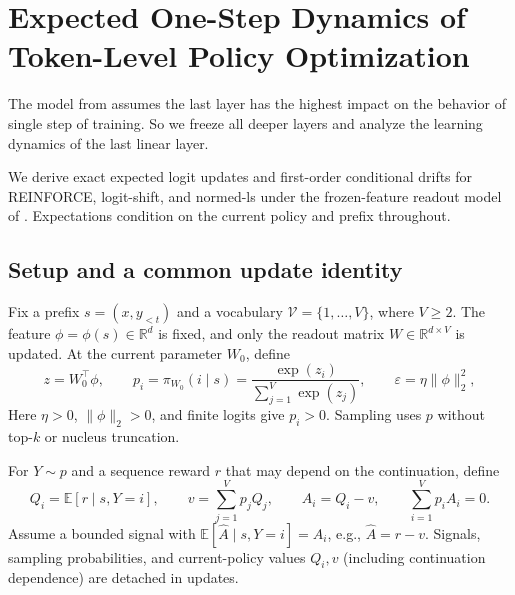 \section{Expected One-Step Dynamics of Token-Level Policy Optimization}
\label{app:token-learning-dynamics}

\begin{insight}
  The model from \citet{ren_learning_2025} assumes the last layer has the highest impact on the behavior of single step of training. So we freeze all deeper layers and analyze the learning dynamics of the last linear layer.
\end{insight}

We derive exact expected logit updates and first-order conditional drifts
for REINFORCE, logit-shift, and normed-ls under the frozen-feature readout
model of \citet[Appendix~E]{ren_learning_2025}. Expectations condition
on the current policy and prefix throughout.

\subsection{Setup and a common update identity}
\label{app:dynamics-setup}

Fix a prefix $s=(x,y_{<t})$ and a vocabulary $\mathcal V=\{1,\ldots,V\}$,
where $V\ge 2$. The feature $\phi=\phi(s)\in\mathbb R^d$ is fixed, and
only the readout matrix $W\in\mathbb R^{d\times V}$ is updated. At the
current parameter $W_0$, define
\begin{equation}
 z=W_0^\top\phi,\qquad
 p_i=\pi_{W_0}(i\mid s)=\frac{\exp(z_i)}{\sum_{j=1}^V\exp(z_j)},
 \qquad \varepsilon=\eta\|\phi\|_2^2,
 \label{eq:dyn-model}
\end{equation}
Here $\eta>0$, $\|\phi\|_2>0$, and finite logits give $p_i>0$.
Sampling uses $p$ without top-$k$ or nucleus truncation.

For $Y\sim p$ and a sequence reward $r$ that may depend on the continuation,
define
\begin{equation}
 Q_i=\mathbb E[r\mid s,Y=i],\qquad
 v=\sum_{j=1}^V p_jQ_j,\qquad
 A_i=Q_i-v,\qquad \sum_{i=1}^V p_iA_i=0.
 \label{eq:dyn-advantage}
\end{equation}
Assume a bounded signal with $\mathbb E[\widehat A\mid s,Y=i]=A_i$,
e.g., $\widehat A=r-v$. Signals, sampling probabilities, and current-policy
values $Q_i,v$ (including continuation dependence) are detached in updates.

